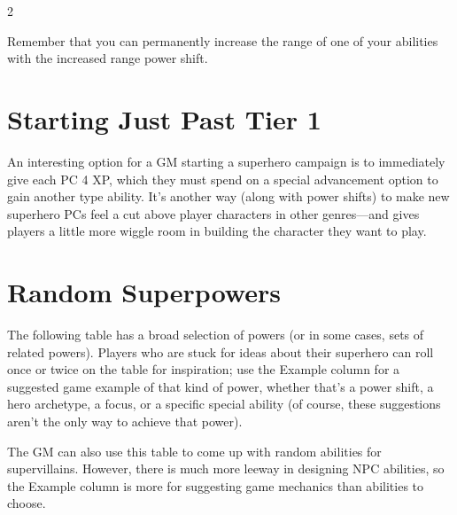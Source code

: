 \begin{multicols}{2}

Remember that you can permanently increase the range of one of your abilities with the increased range power shift.

\section{Starting Just Past Tier 1}

An interesting option for a GM starting a superhero campaign is to immediately give each PC 4 XP, which they must spend on a special advancement option to gain another type ability. It’s another way (along with power shifts) to make new superhero PCs feel a cut above player characters in other genres—and gives players a little more wiggle room in building the character they want to play.

\section{Random Superpowers}

The following table has a broad selection of powers (or in some cases, sets of related powers). Players who are stuck for ideas about their superhero can roll once or twice on the table for inspiration; use the Example column for a suggested game example of that kind of power, whether that’s a power shift, a hero archetype, a focus, or a specific special ability (of course, these suggestions aren’t the only way to achieve that power).

The GM can also use this table to come up with random abilities for supervillains. However, there is much more leeway in designing NPC abilities, so the Example column is more for suggesting game mechanics than abilities to choose.

\end{multicols}

